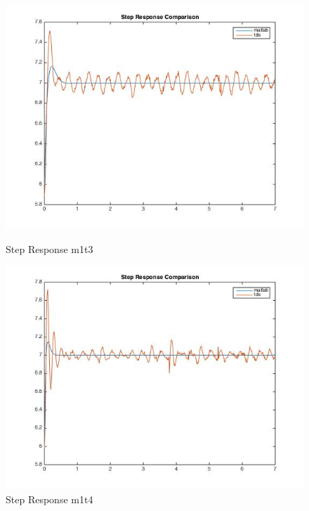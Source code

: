 \documentclass[11pt,titlepage]{article}
\begin{document}
    \begin{figure}[H]
        \centering
        \begin{minipage}{.5\textwidth}
            \centering
            \includegraphics[scale=.3]{stepM1_T3}
            \caption{Step Response m1t3}
            \label{fig:stepM1_T3}
        \end{minipage}%
        \begin{minipage}{.5\textwidth}
            \centering
            \includegraphics[scale=.3]{stepM1_T4}
            \caption{Step Response m1t4}
            \label{fig:stepM1_T4}
        \end{minipage}%
    \end{figure}
\end{document}
